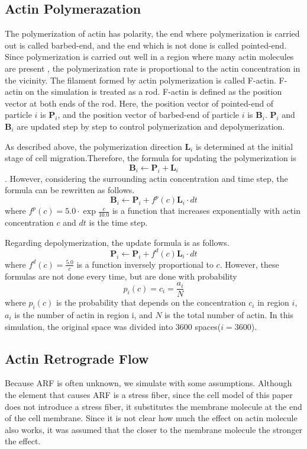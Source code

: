 \documentclass[a4paper,12pt]{book}
\begin{document}
\subsection{Actin Polymerazation}
The polymerization of actin has polarity, the end where polymerization is carried out is called barbed-end, and the end which is not done is called pointed-end. Since polymerization is carried out well in a region where many actin molecules are present , the polymerization rate is proportional to the actin concentration in the vicinity.  The filament formed by actin polymerization is called F-actin. F-actin on the simulation is treated as a rod. F-actin is defined as the position vector at both ends of the rod.
Here, the position vector of pointed-end of particle $i$ is $\bm{P}_i$, and the position vector of barbed-end of particle $i$ is $\bm{B}_i$.
$\bm{P}_i$ and $\bm{B}_i$ are updated step by step to control polymerization and depolymerization.

As described above, the polymerization direction $\bm{L}_i$ is determined at the initial stage of cell migration.Therefore, the formula for updating the polymerization is \[\bm{B}_i \gets \bm{P}_i + \bm{L}_i\]. However, considering the surrounding actin concentration and time step, the formula can be rewritten as follows.
\begin{equation}
\bm{B}_i \gets \bm{P}_i + f^p(c)\bm{L}_i \cdot dt
\end{equation}
where $f^p(c) = 5.0 \cdot \exp{\frac{c}{10.0}}$ is a function that  increases exponentially with actin concentration $c$ and $dt$ is the time step.

Regarding depolymerization, the update formula is as follows.
\begin{equation}
\bm{P}_i \gets \bm{P}_i + f^d(c)\bm{L}_i \cdot dt
\end{equation}
where  $f^d(c) = \frac{5.0}{c}$ is a function inversely proportional to $c$. However, these formulas are not done every time, but are done with probability \[p_i(c) = c_i = \frac{a_i}{N}\] where $p_i(c)$ is the probability that depends on the concentration $c_i$ in region $i$, $a_i$ is the number of actin in region i, and $N$ is the total number of actin. In this simulation, the original space was divided into 3600 spaces($i=3600$).


\subsection{Actin Retrograde Flow}
Because ARF is often unknown, we simulate with some assumptions. Although the element that causes ARF is a stress fiber, since the cell model of this paper does not introduce a stress fiber, it substitutes the membrane molecule at the end of the cell membrane. Since it is not clear how much the effect on actin molecule also works, it was assumed that the closer to the membrane molecule the stronger the effect.
\end{document}
